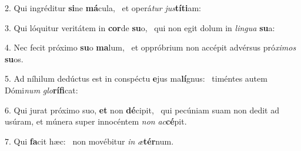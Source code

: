 2. Qui ingréditur \textbf{si}ne \textbf{má}cula, \ast\  et operá\textit{tur} \textit{jus}\textbf{tí}\textbf{ti}am:\

3. Qui lóquitur veritátem in \textbf{cor}de \textbf{su}o, \ast\  qui non egit dolum in \textit{lin}\textit{gua} \textbf{su}a:\

4. Nec fecit próximo \textbf{su}o \textbf{ma}lum, \ast\  et oppróbrium non accépit advérsus pró\textit{xi}\textit{mos} \textbf{su}os.\

5. Ad níhilum dedúctus est in conspéctu \textbf{e}jus ma\textbf{lí}gnus: \ast\  timéntes autem Dómi\textit{num} \textit{glo}\textbf{rí}\textbf{fi}cat:\

6. Qui jurat próximo suo, \textbf{et} non \textbf{dé}cipit, \ast\  qui pecúniam suam non dedit ad usúram, et múnera super innocéntem \textit{non} \textit{ac}\textbf{cé}pit.\

7. Qui \textbf{fa}cit hæc: \ast\  non movébitur \textit{in} \textit{æ}\textbf{tér}num.\

